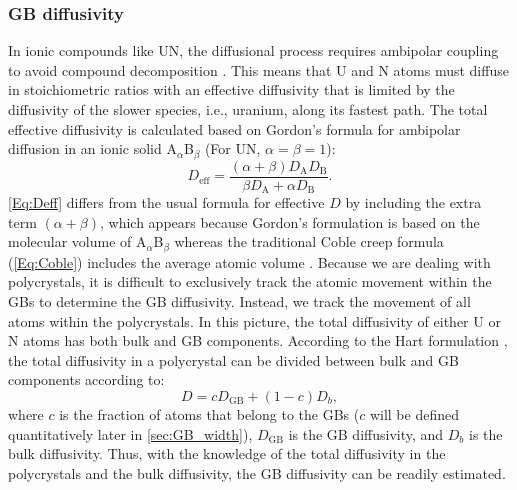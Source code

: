 \documentclass[preprint,12pt,sort&compress]{elsarticle}
\newcommand{\?}{\stackrel{?}{=}}
\begin{document}
\subsubsection{GB diffusivity}
\label{Sec:GBD}


In ionic compounds like UN, the diffusional process requires ambipolar coupling to avoid compound decomposition \cite{Gordon1974}. This means that U and N atoms must diffuse in stoichiometric ratios with an effective diffusivity that is limited by the diffusivity of the slower species, i.e., uranium, along its fastest path. The total effective diffusivity is calculated based on Gordon's formula \cite{Gordon1974} for ambipolar diffusion in an ionic solid A$_{\alpha}$B$_{\beta}$ (For UN, $\alpha = \beta = 1$):
\begin{equation}
D_\mathrm{eff} = \frac{(\alpha + \beta) D_\mathrm{A} D_\mathrm{B} }{\beta D_\mathrm{A} + \alpha D_\mathrm{B}}.
\label{Eq:Deff}
\end{equation}
\cref{Eq:Deff} differs from the usual formula for effective $D$ by including the extra term $(\alpha + \beta)$, which appears because Gordon's formulation is based on the molecular volume of A$_{\alpha}$B$_{\beta}$ whereas the traditional Coble creep formula (\cref{Eq:Coble}) includes the average atomic volume \cite{Kizilyalli1999, Desai2008}. Because we are dealing with polycrystals, it is difficult to exclusively track the atomic movement within the GBs to determine the GB diffusivity. Instead, we track the movement of all atoms within the polycrystals. In this picture, the total diffusivity of either U or N atoms has both bulk and GB components. According to the Hart formulation \cite{Hart1957, Riet2021}, the total diffusivity in a polycrystal can be divided between bulk and GB components according to:
\begin{equation}
D = c D_\mathrm{GB} + (1-c) D_b,
\end{equation}
where $c$ is the fraction of atoms that belong to the GBs ($c$ will be defined quantitatively later in \cref{sec:GB_width}), $D_\mathrm{GB}$ is the GB diffusivity, and $D_b$ is the bulk diffusivity. Thus, with the knowledge of the total diffusivity in the polycrystals and the bulk diffusivity, the GB diffusivity can be readily estimated. 
\end{document}
